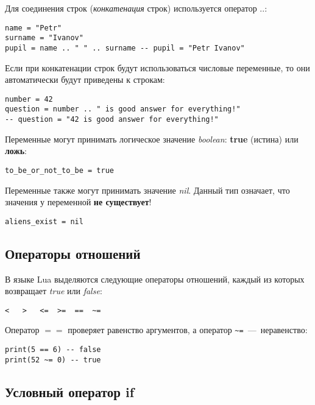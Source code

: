 Для соединения строк (\emph{конкатенация} строк) используется оператор $..$:

\begin{lstlisting}
name = "Petr"
surname = "Ivanov"
pupil = name .. " " .. surname -- pupil = "Petr Ivanov"
\end{lstlisting}

Если при конкатенации строк будут использоваться числовые переменные, то они автоматически будут приведены к строкам:

\begin{lstlisting}
number = 42
question = number .. " is good answer for everything!"
-- question = "42 is good answer for everything!"
\end{lstlisting}

Переменные могут принимать логическое значение \emph{boolean}: \textbf{true} (истина) или \textbf{ложь}:

\begin{lstlisting}
to_be_or_not_to_be = true
\end{lstlisting}

Переменные также могут принимать значение \emph{nil}. Данный тип означает, что значения у переменной \textbf{не существует}!

\begin{lstlisting}
aliens_exist = nil
\end{lstlisting}

\subsection{Операторы отношений}

В языке Lua выделяются следующие операторы отношений, каждый из которых возвращает \emph{true} или \emph{false}:

\begin{lstlisting}
<   >   <=  >=  ==  ~=
\end{lstlisting}

Оператор $==$ проверяет равенство аргументов, а оператор \lstinline{~=}~---~неравенство:

\begin{lstlisting}
print(5 == 6) -- false
print(52 ~= 0) -- true
\end{lstlisting}

\subsection{Условный оператор if}

